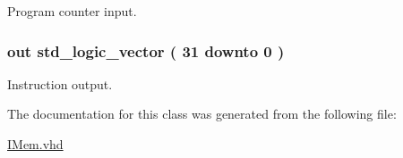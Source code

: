 \-Program counter input. 

\hypertarget{classimem_ac89b0bccd70cd43f4ea4ae5521cf8052}{
\subsubsection[{\-Instruction}]{ {\bfseries out } {\bfseries std\-\_\-logic\-\_\-vector (   31    downto    0  ) } }}\label{classimem_ac89b0bccd70cd43f4ea4ae5521cf8052}


\-Instruction output. 



\-The documentation for this class was generated from the following file\-:\begin{DoxyCompactItemize}
\item 
\hyperlink{_i_mem_8vhd}{\-I\-Mem.\-vhd}\end{DoxyCompactItemize}
